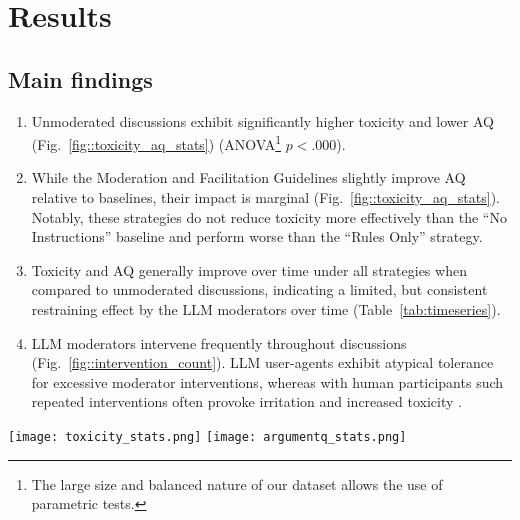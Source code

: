 %

\section{Results}
\label{sec:results}

\subsection{Main findings}

\begin{enumerate}
    \item Unmoderated discussions exhibit significantly higher toxicity and lower \ac{AQ} (Fig.~\ref{fig::toxicity_aq_stats}) (ANOVA\footnote{The large size and balanced nature of our dataset allows the use of parametric tests.} $p<.000$).

    \item  While the Moderation and Facilitation Guidelines slightly improve \ac{AQ} relative to baselines, their impact is marginal (Fig.~\ref{fig::toxicity_aq_stats}). Notably, these strategies do not reduce toxicity more effectively than the “No Instructions” baseline and perform worse than the “Rules Only” strategy.

    \item Toxicity and \ac{AQ} generally improve over time under all strategies when compared to unmoderated discussions, indicating a limited, but consistent restraining effect by the \ac{LLM} moderators over time (Table~\ref{tab:timeseries}).

    \item \ac{LLM} moderators intervene frequently throughout discussions (Fig.~\ref{fig::intervention_count}). \ac{LLM} user-agents exhibit atypical tolerance for excessive moderator interventions, whereas with human participants such repeated interventions often provoke irritation and increased toxicity \cite{schaffner_community_guidelines, make_reddit_great, proactive_moderation, cresci_pesonalized_interventions}.
\end{enumerate}


\begin{figure*}[t]
    \texttt{[image: toxicity\_stats.png]} \hfill
    \texttt{[image: argumentq\_stats.png]}
	\centering
	\caption{Mean difference of Toxicity (left) and \ac{AQ} (right) between each moderation strategy. $A[i, j] = 0.3^{***}$ indicates that the strategy $i$ leads to overall worse discussions (more toxicity/worse arguments) compared to $j$ for an average of $0.3$ annotation levels ($1-5$) with $p<0.001$. Each comparison is accompanied by pairwise student-t tests, in the form of significance asterisks.}
	\label{fig::toxicity_aq_stats}
\end{figure*}

